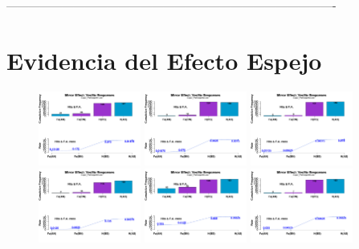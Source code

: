 ----------------------------------------------------------------------------------------

\section{Evidencia del Efecto Espejo}

\begin{figure}[th]
\centering
\includegraphics[width=0.30\textwidth]{Figures/MirrorRate_Exp2_P1} \includegraphics[width=0.30\textwidth]{Figures/MirrorRate_Exp2_P2} \includegraphics[width=0.30\textwidth]{Figures/MirrorRate_Exp2_P3}
\includegraphics[width=0.30\textwidth]{Figures/MirrorRate_Exp2_P4} \includegraphics[width=0.30\textwidth]{Figures/MirrorRate_Exp2_P5} \includegraphics[width=0.30\textwidth]{Figures/MirrorRate_Exp2_P6}

\end{figure}
